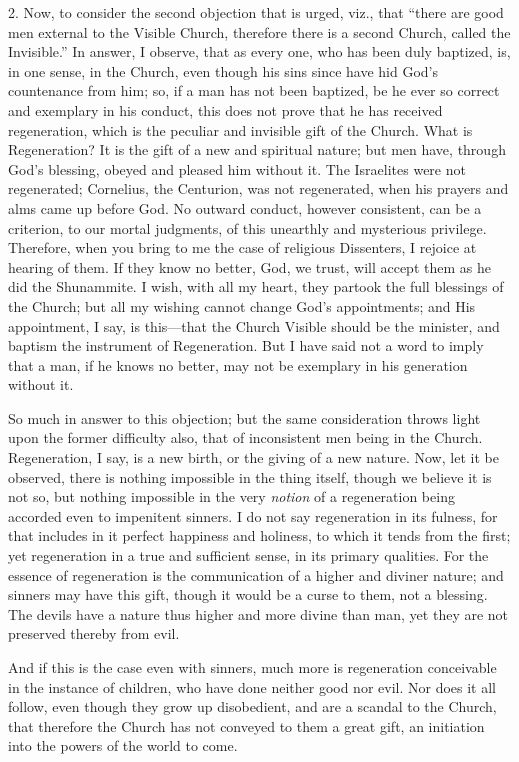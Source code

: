2. Now, to consider the second objection that is urged, viz., that
``there are good men external to the Visible Church, therefore
there is a second Church, called the Invisible.'' In answer, I
observe, that as every one, who has been duly baptized, is, in one
sense, in the Church, even though his sins since have hid God's
countenance from him; so, if a man has not been baptized, be he ever
so correct and exemplary in his conduct, this does not prove that he
has received regeneration, which is the peculiar and invisible gift of
the Church. What is Regeneration? It is the gift of a new and
spiritual nature; but men have, through God's blessing, obeyed and
pleased him without it. The Israelites were not regenerated;
Cornelius, the Centurion, was not regenerated, when his prayers and
alms came up before God. No outward conduct, however consistent, can
be a criterion, to our mortal judgments, of this unearthly and
mysterious privilege. Therefore, when you bring to me the case of
religious Dissenters, I rejoice at hearing of them. If they know no
better, God, we trust, will accept them as he did the Shunammite. I
wish, with all my heart, they partook the full blessings of the
Church; but all my wishing cannot change God's appointments; and His
appointment, I say, is this—that the Church Visible should be the
minister, and baptism the instrument of Regeneration. But I have said
not a word to imply that a man, if he knows no better, may not be
exemplary in his generation without it.

So much in answer to this objection; but the same consideration
throws light upon the former difficulty also, that of inconsistent men
being in the Church. Regeneration, I say, is a new birth, or the
giving of a new nature. Now, let it be observed, there is nothing
impossible in the thing itself, though we believe it is not so, but
nothing impossible in the very \emph{notion} of a regeneration being
accorded even to impenitent sinners. I do not say regeneration in its
fulness, for that includes in it perfect happiness and holiness, to
which it tends from the first; yet regeneration in a true and
sufficient sense, in its primary qualities. For the essence of
regeneration is the communication of a higher and diviner nature; and
sinners may have this gift, though it would be a curse to them, not a
blessing. The devils have a nature thus higher and more divine than
man, yet they are not preserved thereby from evil.

And if this is the case even with sinners, much more is
regeneration conceivable in the instance of children, who have done
neither good nor evil. Nor does it all follow, even though they
grow up disobedient, and are a scandal to the Church, that therefore
the Church has not conveyed to them a great gift, an initiation into
the powers of the world to come.

